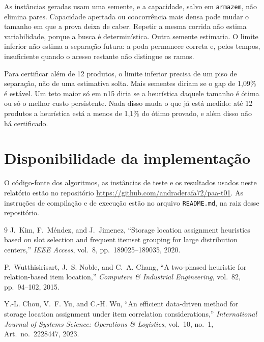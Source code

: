 \documentclass[conference,a4paper]{IEEEtran}
\begin{document}
As instâncias geradas usam uma semente, e a capacidade, salvo em \texttt{armazem}, não elimina pares.
Capacidade apertada ou coocorrência mais densa pode mudar o tamanho em que a prova deixa de caber.
Repetir a mesma corrida não estima variabilidade, porque a busca é determinística.
Outra semente estimaria.
O limite inferior não estima a separação futura: a poda permanece correta e, pelos tempos, insuficiente quando o acesso restante não distingue os ramos.

Para certificar além de 12 produtos, o limite inferior precisa de um piso de separação, não de uma estimativa solta.
Mais sementes diriam se o gap de 1,09\% é estável.
Um teto maior só em n15 diria se a heurística daquele tamanho é ótima ou só o melhor custo persistente.
Nada disso muda o que já está medido: até 12 produtos a heurística está a menos de 1,1\% do ótimo provado, e além disso não há certificado.

\section{Disponibilidade da implementação}
O código-fonte dos algoritmos, as instâncias de teste e os resultados usados neste relatório estão no repositório \url{https://github.com/andraderafa72/paa-t01}.
As instruções de compilação e de execução estão no arquivo \texttt{README.md}, na raiz desse repositório.

\begin{thebibliography}{9}
J.~Kim, F.~Méndez, and J.~Jimenez, ``Storage location assignment heuristics based on slot selection and frequent itemset grouping for large distribution centers,'' \emph{IEEE Access}, vol.~8, pp.~189025--189035, 2020.

P.~Wutthisirisart, J.~S. Noble, and C.~A. Chang, ``A two-phased heuristic for relation-based item location,'' \emph{Computers \& Industrial Engineering}, vol.~82, pp.~94--102, 2015.

Y.-L. Chou, V.~F. Yu, and C.-H. Wu, ``An efficient data-driven method for storage location assignment under item correlation considerations,'' \emph{International Journal of Systems Science: Operations \& Logistics}, vol.~10, no.~1, Art.~no.~2228447, 2023.
\end{thebibliography}
\end{document}
